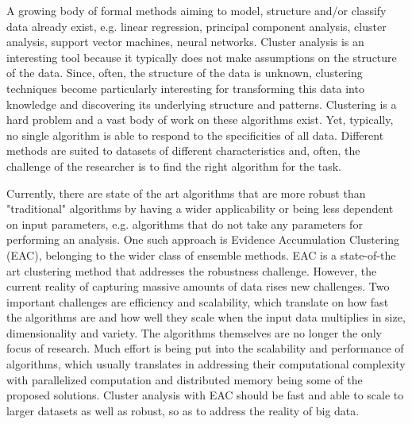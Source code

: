 A growing body of formal methods aiming to model, structure and/or classify data already exist, e.g. linear regression, principal component analysis, cluster analysis, support vector machines, neural networks.
Cluster analysis is an interesting tool because it typically does not make assumptions on the structure of the data.
Since, often, the structure of the data is unknown, clustering techniques become particularly interesting for transforming this data into knowledge and discovering its underlying structure and patterns.
Clustering is a hard problem and a vast body of work on these algorithms exist.
Yet, typically, no single algorithm is able to respond to the specificities of all data.
Different methods are suited to datasets of different characteristics and, often, the challenge of the researcher is to find the right algorithm for the task. %

Currently, there are state of the art algorithms that are more robust than "traditional" algorithms by having a wider applicability or being less dependent on input parameters, e.g. algorithms that do not take any parameters for performing an analysis.
One such approach is Evidence Accumulation Clustering (EAC), belonging to the wider class of ensemble methods.
EAC is a state-of-the art clustering method that addresses the robustness challenge.
However, the current reality of capturing massive amounts of data rises new challenges.
Two important challenges are efficiency and scalability, which translate on how fast the algorithms are and how well they scale when the input data multiplies in size, dimensionality and variety.
The algorithms themselves are no longer the only focus of research.
Much effort is being put into the scalability and performance of algorithms, which usually translates in addressing their computational complexity with parallelized computation and distributed memory being some of the proposed solutions.
Cluster analysis with EAC should be fast and able to scale to larger datasets as well as robust, so as to address the reality of big data.


